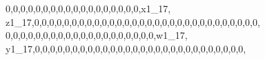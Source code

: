 \documentclass[]{article}
\newenvironment{Shaded}{\begin{snugshade}}{\end{snugshade}}
\newcommand{\DecValTok}[1]{\textcolor[rgb]{0.00,0.00,0.81}{#1}}
\newcommand{\NormalTok}[1]{#1}
\begin{document}
\begin{Shaded}
\begin{Highlighting}[]
\DecValTok{0}\NormalTok{,}\DecValTok{0}\NormalTok{,}\DecValTok{0}\NormalTok{,}\DecValTok{0}\NormalTok{,}\DecValTok{0}\NormalTok{,}\DecValTok{0}\NormalTok{,}\DecValTok{0}\NormalTok{,}\DecValTok{0}\NormalTok{,}\DecValTok{0}\NormalTok{,}\DecValTok{0}\NormalTok{,}\DecValTok{0}\NormalTok{,}\DecValTok{0}\NormalTok{,}\DecValTok{0}\NormalTok{,}\DecValTok{0}\NormalTok{,}\DecValTok{0}\NormalTok{,}\DecValTok{0}\NormalTok{,}\DecValTok{0}\NormalTok{,}\DecValTok{0}\NormalTok{,x1_}\DecValTok{17}\NormalTok{, z1_}\DecValTok{17}\NormalTok{,}\DecValTok{0}\NormalTok{,}\DecValTok{0}\NormalTok{,}\DecValTok{0}\NormalTok{,}\DecValTok{0}\NormalTok{,}\DecValTok{0}\NormalTok{,}\DecValTok{0}\NormalTok{,}\DecValTok{0}\NormalTok{,}\DecValTok{0}\NormalTok{,}\DecValTok{0}\NormalTok{,}\DecValTok{0}\NormalTok{,}\DecValTok{0}\NormalTok{,}\DecValTok{0}\NormalTok{,}\DecValTok{0}\NormalTok{,}\DecValTok{0}\NormalTok{,}\DecValTok{0}\NormalTok{,}\DecValTok{0}\NormalTok{,}\DecValTok{0}\NormalTok{,}\DecValTok{0}\NormalTok{,}\DecValTok{0}\NormalTok{,}\DecValTok{0}\NormalTok{,}\DecValTok{0}\NormalTok{,}\DecValTok{0}\NormalTok{,}\DecValTok{0}\NormalTok{,}\DecValTok{0}\NormalTok{,}\DecValTok{0}\NormalTok{,}\DecValTok{0}\NormalTok{,}\DecValTok{0}\NormalTok{,}\DecValTok{0}\NormalTok{,}\DecValTok{0}\NormalTok{,}\DecValTok{0}\NormalTok{,}
\DecValTok{0}\NormalTok{,}\DecValTok{0}\NormalTok{,}\DecValTok{0}\NormalTok{,}\DecValTok{0}\NormalTok{,}\DecValTok{0}\NormalTok{,}\DecValTok{0}\NormalTok{,}\DecValTok{0}\NormalTok{,}\DecValTok{0}\NormalTok{,}\DecValTok{0}\NormalTok{,}\DecValTok{0}\NormalTok{,}\DecValTok{0}\NormalTok{,}\DecValTok{0}\NormalTok{,}\DecValTok{0}\NormalTok{,}\DecValTok{0}\NormalTok{,}\DecValTok{0}\NormalTok{,}\DecValTok{0}\NormalTok{,}\DecValTok{0}\NormalTok{,}\DecValTok{0}\NormalTok{,}\DecValTok{0}\NormalTok{,}\DecValTok{0}\NormalTok{,w1_}\DecValTok{17}\NormalTok{, y1_}\DecValTok{17}\NormalTok{,}\DecValTok{0}\NormalTok{,}\DecValTok{0}\NormalTok{,}\DecValTok{0}\NormalTok{,}\DecValTok{0}\NormalTok{,}\DecValTok{0}\NormalTok{,}\DecValTok{0}\NormalTok{,}\DecValTok{0}\NormalTok{,}\DecValTok{0}\NormalTok{,}\DecValTok{0}\NormalTok{,}\DecValTok{0}\NormalTok{,}\DecValTok{0}\NormalTok{,}\DecValTok{0}\NormalTok{,}\DecValTok{0}\NormalTok{,}\DecValTok{0}\NormalTok{,}\DecValTok{0}\NormalTok{,}\DecValTok{0}\NormalTok{,}\DecValTok{0}\NormalTok{,}\DecValTok{0}\NormalTok{,}\DecValTok{0}\NormalTok{,}\DecValTok{0}\NormalTok{,}\DecValTok{0}\NormalTok{,}\DecValTok{0}\NormalTok{,}\DecValTok{0}\NormalTok{,}\DecValTok{0}\NormalTok{,}\DecValTok{0}\NormalTok{,}\DecValTok{0}\NormalTok{,}\DecValTok{0}\NormalTok{,}\DecValTok{0}\NormalTok{,}

\end{Highlighting}
\end{Shaded}
\end{document}

